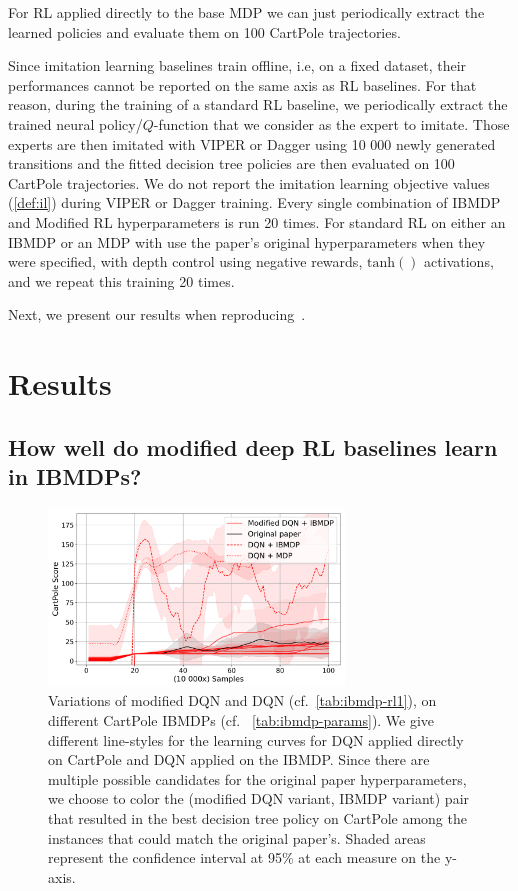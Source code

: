 For RL applied directly to the base MDP we can just periodically extract the learned policies and evaluate them on 100 CartPole trajectories.

Since imitation learning baselines train offline, i.e, on a fixed dataset, their performances cannot be reported on the same axis as RL baselines.
For that reason, during the training of a standard RL baseline, we periodically extract the trained neural policy/$Q$-function that we consider as the expert to imitate.
Those experts are then imitated with VIPER or Dagger using 10 000 newly generated transitions and the fitted decision tree policies are then evaluated on 100 CartPole trajectories.
We do not report the imitation learning objective values (\ref{def:il}) during VIPER or Dagger training.
Every single combination of IBMDP and Modified RL hyperparameters is run 20 times.
For standard RL on either an IBMDP or an MDP with use the paper's original hyperparameters when they were specified, with depth control using negative rewards, $\operatorname{tanh()}$ activations, and we repeat this training 20 times. 

Next, we present our results when reproducing~\cite[Table 1]{topin2021iterative}.

\section{Results}

\subsection{How well do modified deep RL baselines learn in IBMDPs?}

\begin{figure}
    \centering
    \includegraphics[width=0.7\textwidth]{images/images_part1/dqn.pdf}
    \caption{Variations of modified DQN and DQN (cf.~\ref{tab:ibmdp-rl1}), on different CartPole IBMDPs (cf. ~\ref{tab:ibmdp-params}). We give different line-styles for the learning curves for DQN applied directly on CartPole and DQN applied on the IBMDP.
    Since there are multiple possible candidates for the original paper hyperparameters, we choose to color the (modified DQN variant, IBMDP variant) pair that resulted in the best decision tree policy on CartPole among the instances that could match the original paper's.
    Shaded areas represent the confidence interval at 95\% at each measure on the y-axis.}
\end{figure}\label{fig:res-dqn}

